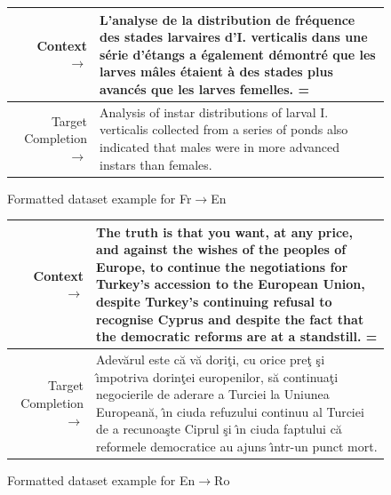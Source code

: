 \begin{figure} { \tt \footnotesize \begin{tabularx}{\linewidth}{r X} \toprule Context $\to$ & L'analyse de la distribution de fr\'equence des stades larvaires d'I. verticalis dans une s\'erie d'\'etangs a \'egalement d\'emontr\'e que les larves m\^ales \'etaient \`a des stades plus avanc\'es que les larves femelles. = \\ 
 \midrule Target Completion $\to$ & Analysis of instar distributions of larval I. verticalis collected from a series of ponds also indicated that males were in more advanced instars than females. \\
\bottomrule \end{tabularx} }  \caption{Formatted dataset example for Fr$\to$En}  \label{eval:Fr_En}  \end{figure}%
\begin{figure} { \tt \footnotesize \begin{tabularx}{\linewidth}{r X} \toprule Context $\to$ & The truth is that you want, at any price, and against the wishes of the peoples of Europe, to continue the negotiations for Turkey's accession to the European Union, despite Turkey's continuing refusal to recognise Cyprus and despite the fact that the democratic reforms are at a standstill. = \\ 
 \midrule Target Completion $\to$ & Adev\u{a}rul este c\u{a} v\u{a} dori\c{t}i, cu orice pre\c{t} \c{s}i {\^\i}mpotriva dorin\c{t}ei europenilor, s\u{a} continua\c{t}i negocierile de aderare a Turciei la Uniunea European\u{a}, {\^\i}n ciuda refuzului continuu al Turciei de a recunoa\c{s}te Ciprul \c{s}i {\^\i}n ciuda faptului c\u{a} reformele democratice au ajuns {\^\i}ntr-un punct mort. \\
\bottomrule \end{tabularx} }  \caption{Formatted dataset example for En$\to$Ro}  \label{eval:En_Ro}  \end{figure}%
